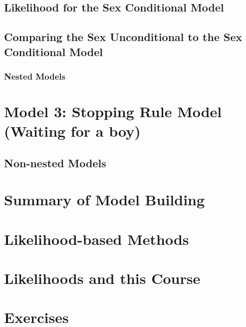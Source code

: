 \documentclass[
]{krantz}
\begin{document}
\hypertarget{sex_cond_lik.sec}{%
\subsection{Likelihood for the Sex Conditional Model}\label{sex_cond_lik.sec}}

\hypertarget{sec-lrtest}{%
\subsection{Comparing the Sex Unconditional to the Sex Conditional Model}\label{sec-lrtest}}

\hypertarget{nested-models}{%
\subsubsection{Nested Models}\label{nested-models}}

\hypertarget{model-3-stopping-rule-model-waiting-for-a-boy}{%
\section{Model 3: Stopping Rule Model (Waiting for a boy)}\label{model-3-stopping-rule-model-waiting-for-a-boy}}

\hypertarget{non-nested-models}{%
\subsection{Non-nested Models}\label{non-nested-models}}

\hypertarget{summary-of-model-building}{%
\section{Summary of Model Building}\label{summary-of-model-building}}

\hypertarget{likelihood-based-methods}{%
\section{Likelihood-based Methods}\label{likelihood-based-methods}}

\hypertarget{likelihoods-and-this-course}{%
\section{Likelihoods and this Course}\label{likelihoods-and-this-course}}

\hypertarget{exercises-1}{%
\section{Exercises}\label{exercises-1}}
\end{document}

